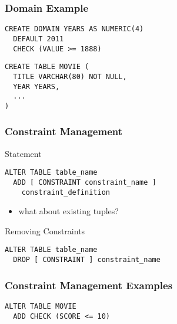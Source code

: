 \documentclass[dvipsnames]{beamer}
\theoremstyle{plain}
\begin{document}
\begin{frame}[fragile]
  \frametitle{Domain Example}

  \begin{example}
    \begin{lstlisting}
CREATE DOMAIN YEARS AS NUMERIC(4)
  DEFAULT 2011
  CHECK (VALUE >= 1888)
    \end{lstlisting}

    \pause
    \begin{lstlisting}
CREATE TABLE MOVIE (
  TITLE VARCHAR(80) NOT NULL,
  YEAR YEARS,
  ...
)
    \end{lstlisting}
  \end{example}
\end{frame}

\begin{frame}[fragile]
  \frametitle{Constraint Management}

  \begin{block}{Statement}
    \begin{lstlisting}
ALTER TABLE table_name
  ADD [ CONSTRAINT constraint_name ]
    constraint_definition
    \end{lstlisting}
  \end{block}

  \pause
  \begin{itemize}
    \item what about existing tuples?
  \end{itemize}

  \pause
  \begin{block}{Removing Constraints}
    \begin{lstlisting}
ALTER TABLE table_name
  DROP [ CONSTRAINT ] constraint_name
    \end{lstlisting}
  \end{block}
\end{frame}

\begin{frame}[fragile]
  \frametitle{Constraint Management Examples}

  \begin{example}
    \begin{lstlisting}
ALTER TABLE MOVIE
  ADD CHECK (SCORE <= 10)
    \end{lstlisting}
  \end{example}
\end{frame}
\end{document}
